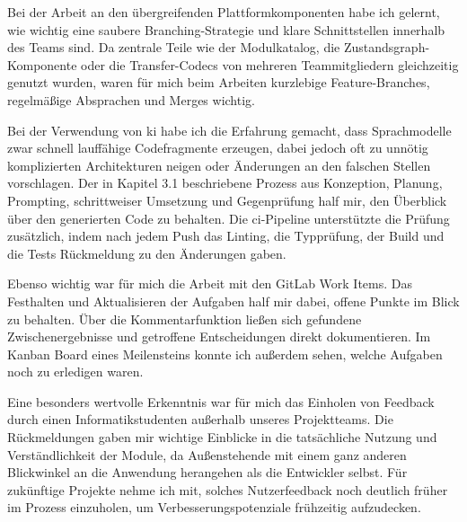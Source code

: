 Bei der Arbeit an den übergreifenden Plattformkomponenten habe ich gelernt, wie wichtig eine saubere Branching-Strategie und klare Schnittstellen innerhalb des Teams sind. Da zentrale Teile wie der Modulkatalog, die Zustandsgraph-Komponente oder die Transfer-Codecs von mehreren Teammitgliedern gleichzeitig genutzt wurden, waren für mich beim Arbeiten kurzlebige Feature-Branches, regelmäßige Absprachen und Merges wichtig.

Bei der Verwendung von \gls{ki} habe ich die Erfahrung gemacht, dass Sprachmodelle zwar schnell lauffähige Codefragmente erzeugen, dabei jedoch oft zu unnötig komplizierten Architekturen neigen oder Änderungen an den falschen Stellen vorschlagen. Der in Kapitel 3.1 beschriebene Prozess aus Konzeption, Planung, Prompting, schrittweiser Umsetzung und Gegenprüfung half mir, den Überblick über den generierten Code zu behalten. Die \gls{ci}-Pipeline unterstützte die Prüfung zusätzlich, indem nach jedem Push das Linting, die Typprüfung, der Build und die Tests Rückmeldung zu den Änderungen gaben.

Ebenso wichtig war für mich die Arbeit mit den GitLab Work Items. Das Festhalten und Aktualisieren der Aufgaben half mir dabei, offene Punkte im Blick zu behalten. Über die Kommentarfunktion ließen sich gefundene Zwischenergebnisse und getroffene Entscheidungen direkt dokumentieren. Im Kanban Board eines Meilensteins konnte ich außerdem sehen, welche Aufgaben noch zu erledigen waren.

Eine besonders wertvolle Erkenntnis war für mich das Einholen von Feedback durch einen Informatikstudenten außerhalb unseres Projektteams. Die Rückmeldungen gaben mir wichtige Einblicke in die tatsächliche Nutzung und Verständlichkeit der Module, da Außenstehende mit einem ganz anderen Blickwinkel an die Anwendung herangehen als die Entwickler selbst. Für zukünftige Projekte nehme ich mit, solches Nutzerfeedback noch deutlich früher im Prozess einzuholen, um Verbesserungspotenziale frühzeitig aufzudecken.
